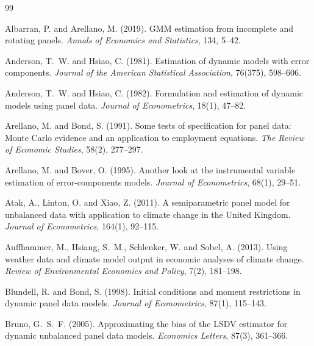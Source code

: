 \documentclass[11pt,a4paper]{article}
\begin{document}
\begin{thebibliography}{99}
\small
\setlength{\itemsep}{1pt}

Albarran, P. and Arellano, M. (2019). GMM estimation from incomplete and rotating panels. \emph{Annals of Economics and Statistics}, 134, 5--42. 

Anderson, T.~W. and Hsiao, C. (1981). Estimation of dynamic models with error components. \emph{Journal of the American Statistical Association}, 76(375), 598--606. 

Anderson, T.~W. and Hsiao, C. (1982). Formulation and estimation of dynamic models using panel data. \emph{Journal of Econometrics}, 18(1), 47--82. 

Arellano, M. and Bond, S. (1991). Some tests of specification for panel data: Monte Carlo evidence and an application to employment equations. \emph{The Review of Economic Studies}, 58(2), 277--297. 

Arellano, M. and Bover, O. (1995). Another look at the instrumental variable estimation of error-components models. \emph{Journal of Econometrics}, 68(1), 29--51. 

Atak, A., Linton, O. and Xiao, Z. (2011). A semiparametric panel model for unbalanced data with application to climate change in the United Kingdom. \emph{Journal of Econometrics}, 164(1), 92--115. 

Auffhammer, M., Hsiang, S.~M., Schlenker, W. and Sobel, A. (2013). Using weather data and climate model output in economic analyses of climate change. \emph{Review of Environmental Economics and Policy}, 7(2), 181--198. 

Blundell, R. and Bond, S. (1998). Initial conditions and moment restrictions in dynamic panel data models. \emph{Journal of Econometrics}, 87(1), 115--143. 

Bruno, G.~S.~F. (2005). Approximating the bias of the LSDV estimator for dynamic unbalanced panel data models. \emph{Economics Letters}, 87(3), 361--366. 


\end{thebibliography}
\end{document}
